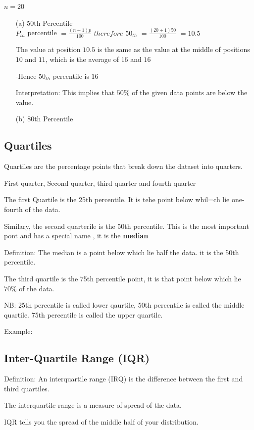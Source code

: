 \documentclass[12pt]{article}
\begin{document}
$n = 20$

\begin{enumerate}
    \item[(a)]50th Percentile \\ $P_{th}$ percentile $= \frac{(n + 1)p}{100}$
    $therefore$ $50_{th}$ $= \frac{(20 + 1)50}{100}$
    $= 10.5$

    The value at position $10.5$ is the same as the value at the middle of positions $10$ and $11$, which is the average of $16$ and $16$

    -Hence $50_{th}$ percentile is $16$

    Interpretation: This implies that $50\%$ of the given data points are below the value.
    \item[(b)] 80th Percentile
\end{enumerate}

\subsection{Quartiles}
Quartiles are the percentage points that break down the dataset into quarters.

First quarter, Second quarter, third quarter and fourth quarter

The first Quartile is the 25th percentile. It is tehe point below whil=ch lie one-fourth of the data.

Similary, the second quarterile is the 50th percentile. This is the most important pont and has a special name , it is the \textbf{median}

Definition: The median is a point below which lie half the data. it is the 50th percentile.

The third quartile is the 75th percentile point, it is that point below which lie $70\%$ of the data.

NB: 25th percentile is called lower qaurtile, 50th percentile is called the middle quartile. 75th percentile is called the upper quartile.

Example:

\subsection{Inter-Quartile Range (IQR)}
Definition: An interquartile range (IRQ) is the difference between the first and third quartiles.

The interquartile range is a measure of spread of the data.

IQR tells you the spread of the middle half of your distribution.
\end{document}
